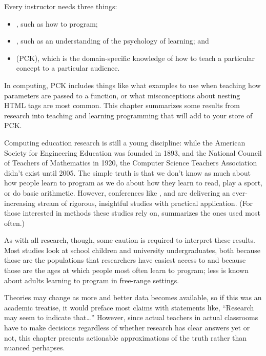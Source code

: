 
Every instructor needs three things:

\begin{itemize}
\item
  , such as how to
  program;
\item
  ,
  such as an understanding of the psychology of learning; and
\item
  (PCK), which is the domain-specific knowledge of how to teach a
  particular concept to a particular audience.
\end{itemize}

In computing, PCK includes things like what examples to use when
teaching how parameters are passed to a function, or what misconceptions
about nesting HTML tags are most common. This chapter summarizes some
results from research into teaching and learning programming that will
add to your store of PCK.

Computing education research is still a young discipline: while the
American Society for Engineering Education was founded in 1893, and
the National Council of Teachers of Mathematics in 1920, the Computer
Science Teachers Association didn't exist until 2005. The simple truth
is that we don't know as much about how people learn to program as we
do about how they learn to read, play a sport, or do basic arithmetic.
However, conferences like ,  and
 are delivering an ever-increasing stream of rigorous,
insightful studies with practical application. (For those interested
in methods these studies rely on, \cite{Ihan2016} summarizes the
ones used most often.)

As with all research, though, some caution is required to interpret
these results. Most studies look at school children and university
undergraduates, both because those are the populations that researchers
have easiest access to \cite{Henr2010} and because those are the ages
at which people most often learn to program; less is known about adults
learning to program in free-range settings.

Theories may change as more and better data becomes available, so if
this was an academic treatise, it would preface most claims with
statements like, ``Research may seem to indicate that{\ldots}''
However, since actual teachers in actual classrooms have to make
decisions regardless of whether research has clear answers yet or not,
this chapter presents actionable approximations of the truth rather than
nuanced perhapses.

